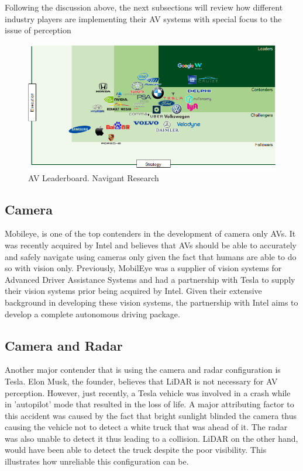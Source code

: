 Following the discussion above, the next subsections will review how different industry players are implementing their AV systems with special focus to the issue of perception
\begin{figure}
	\includegraphics[width=\textwidth]{media/avind.png}
	\caption{AV Leaderboard. Navigant Research\cite{navigantresearch_2018}}
\end{figure}
\subsection{Camera}
Mobileye\cite{mobileye_2018}, is one of the top contenders in the development of camera only AVs. It was recently acquired by Intel and believes that AVs should be able to accurately and safely navigate using cameras only given the fact that humans are able to do so with vision only. Previously, MobilEye was a supplier of vision systems for Advanced Driver Assistance Systems and had a partnership with Tesla to supply their vision systems prior being acquired by Intel. 
Given their extensive background in developing these vision systems, the partnership with Intel aims to develop a complete autonomous driving package.\cite{intelsolutions_2018}
 

\subsection{Camera and  Radar}
Another major contender that is using the camera and radar configuration is Tesla. Elon Musk, the founder, believes that LiDAR is not necessary for AV perception. However, just recently, a Tesla vehicle was involved in a crash while in 'autopilot' mode that resulted in the loss of life. A major attributing factor to this accident was caused by the fact that bright sunlight blinded the camera thus causing the vehicle not to detect a white truck that was ahead of it. The radar was also unable to detect it thus leading to a collision. 
LiDAR on the other hand, would have been able to detect the truck despite the poor visibility. This illustrates how unreliable this configuration can be.


